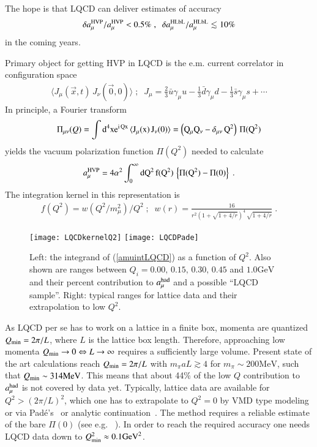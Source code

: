 \documentclass[epj,onecolumn]{webofc}
\newcommand{\gv}{\mbox{GeV}}
\newcommand{\mv}{\mbox{MeV}}
\newcommand{\I}{\rm i }
\newcommand{\D}{\rm d }
\newcommand{\E}{\rm e }
\newcommand{\semis}{\;;\;\; }
\newcommand{\amuh}{a_\mu^{\rm had} }
\newcommand{\bea}{\begin{eqnarray}}
\newcommand{\eea}{\end{eqnarray}}
\newcommand{\epo}{\;. }
\newcommand{\gapprox}{\apprge}
\newcommand{\lapprox}{\apprle}
\begin{document}
The hope is that LQCD can deliver estimates of accuracy
\bea
\delta a_\mu^{\rm HVP}/a_\mu^{\rm HVP} < 0.5 \% \;,\;\;\delta a_\mu^{\rm
HLbL}/a_\mu^{\rm HLbL} \lapprox  10 \%
\eea
in the coming years.

Primary object for getting HVP in LQCD is the e.m. current correlator in configuration
space
\bea
\langle J_\mu(\vec{x},t)\,J_\nu(\vec{0},0)\rangle\semis
J_\mu=\frac23 \bar{u}\gamma_\mu u-\frac13 \bar{d}\gamma_\mu
d-\frac13 \bar{s}\gamma_\mu s + \cdots
\eea
In principle, a Fourier transform
\bea
\Pi_{\mu\nu}(Q)=\int \D^4 x \E^{\I\,Q x}\,\langle
J_\mu(x)\,J_\nu(0)\rangle=\left(Q_\mu Q_\nu-\delta _{\mu\nu}\,Q^2\right)\,\Pi(Q^2)
\eea
yields the vacuum polarization function $\Pi(Q^2)$ needed to calculate
\bea
a_\mu^{\rm HVP}=4\alpha^2\int_0^\infty \D Q^2\, f(Q^2)\,\left\{\Pi(Q^2)-\Pi(0)\right\}\epo
\label{amuintLQCD}
\eea
The integration kernel in this representation is
\bea
f(Q^2)=w(Q^2/m_\mu^2)/Q^2\semis w(r)=\frac{16}{r^2 \left(1+\sqrt{1+4/r}\right)^4\,\sqrt{1+4/r}}\epo
\eea
\begin{figure}[h]
\centering
\texttt{[image: LQCDkernelQ2]}
\texttt{[image: LQCDPade]}\\
\caption{Left: the integrand of (\ref{amuintLQCD}) as a function of
$Q^2$. Also shown are ranges between
$Q_i=0.00,\,0.15,\,0.30,\,0.45$ and $1.0\gv$
and their percent contribution to $\amuh$ and a possible ``LQCD
sample''. Right: typical ranges for lattice data and their extrapolation to low $Q^2$.}
\label{fig:amuintLQCD}
\end{figure}
As LQCD per se has to work on a lattice in a finite box, momenta are
quantized $Q_{\rm min}=2\pi/L$, where $L$ is the lattice box
length. Therefore, approaching low momenta $Q_{\rm min} \to 0
\Leftrightarrow L\to \infty$ requires a sufficiently large volume.
Present state of the art calculations reach $Q_{\rm min}=2\pi/L$ with
$m_\pi aL\gapprox 4$ for $ m_\pi\sim 200\mv$, such that $ Q_{\rm
min}\sim 314\mv$. This means that about 44\% of the low $Q$ contribution to
$\amuh$ is not covered by data yet.
Typically, lattice data are available for $ Q^2>
\left(2\pi/L\right)^2$, which one has to
extrapolate to $ Q^2=0$ by VMD type modeling~\cite{Feng:2011zk} or
via Pad\'e's~\cite{Golterman:2014ksa} or analytic
continuation~\cite{Feng:2013xsa}. The method requires a reliable
estimate of the bare $\Pi(0)$ (see e.g. ~\cite{Borsanyi:2016lpl}). In order to reach the required accuracy
one needs LQCD data down to $Q^2_{\rm min}\approx 0.1\gv^2$.
\cite{Boyle:2011hu,Feng:2013xsa,Aubin:2013daa,Francis:2014dta,Malak:2015sla}
\end{document}
